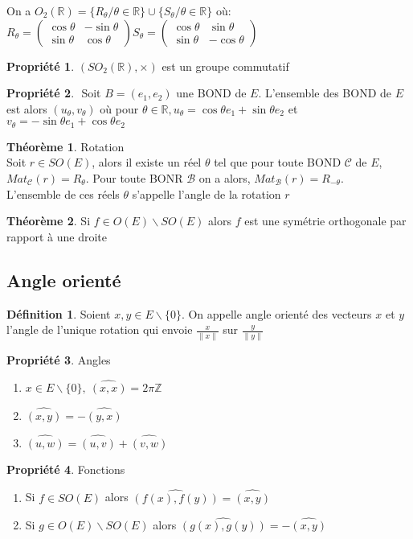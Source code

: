 \documentclass[fleqn]{article}
\theoremstyle{definition} \newtheorem*{defi}{D\'efinition}
\theoremstyle{definition} \newtheorem*{theo}{Th\'eor\`eme}
\theoremstyle{definition} \newtheorem*{coro}{Corollaire}
\theoremstyle{remark} \newtheorem*{rqs}{Remarques}
\theoremstyle{definition} \newtheorem*{prop}{Propri\'et\'e}
\begin{document}
On a $O_2(\mathbb{R}) = \{R_{\theta} / \theta \in \mathbb{R}\} \cup \{S_\theta / \theta \in \mathbb{R}\}$ o\`u: \\
$R_\theta =
\begin{pmatrix}
	\cos \theta & -\sin \theta\\
	\sin \theta & \cos \theta
\end{pmatrix}
S_\theta =
\begin{pmatrix}
	\cos \theta & \sin \theta\\
	\sin \theta & -\cos \theta
\end{pmatrix}$

\begin{prop}
	$(SO_2(\mathbb{R}),\times)$ est un groupe commutatif
\end{prop}

\begin{prop} $ $
	Soit $B = (e_1, e_2)$ une BOND de $E$. L'ensemble des BOND de $E$ est alors $(u_\theta, v_\theta)$ o\`u pour $\theta \in \mathbb{R},
	u_\theta = \cos \theta e_1 + \sin \theta e_2$ et $v_\theta = -\sin \theta e_1 + \cos \theta e_2$
\end{prop}

\begin{theo} Rotation \\
	Soit $r \in SO(E)$, alors il existe un r\'eel $\theta$ tel que pour toute BOND $\mathscr{C}$ de $E$, $Mat_\mathscr{C}(r) = R_\theta$. Pour
	toute BONR $\mathscr{B}$ on a alors, $Mat_\mathscr{B}(r) = R_{-\theta}$. \\
	L'ensemble de ces r\'eels $\theta$ s'appelle l'angle de la rotation $r$
\end{theo}

\begin{theo}
	Si $f \in O(E) \backslash SO(E)$ alors $f$ est une sym\'etrie orthogonale par rapport \`a une droite
\end{theo}

\subsection{Angle orient\'e}

\begin{defi}
	Soient $x,y \in E\backslash \{0\}$. On appelle angle orient\'e des vecteurs $x$ et $y$ l'angle de l'unique rotation qui envoie
	$\frac{x}{\|x\|}$ sur $\frac{y}{\|y\|}$
\end{defi}

\begin{prop} Angles
	\begin{enumerate}
		\item $x \in E \backslash \{0\},\ \hat{(x,x)} = 2\pi\mathbb{Z}$
		\item $\hat{(x,y)} = -\hat{(y,x)}$
		\item $\hat{(u,w)} = \hat{(u,v)} + \hat{(v,w)}$
	\end{enumerate}
\end{prop}

\begin{prop} Fonctions
	\begin{enumerate}
		\item Si $f \in SO(E)$ alors $\hat{(f(x), f(y))} = \hat{(x,y)}$
		\item Si $g \in O(E) \backslash SO(E)$ alors $\hat{(g(x),g(y))} = -\hat{(x,y)}$
	\end{enumerate}
\end{prop}
\end{document}
